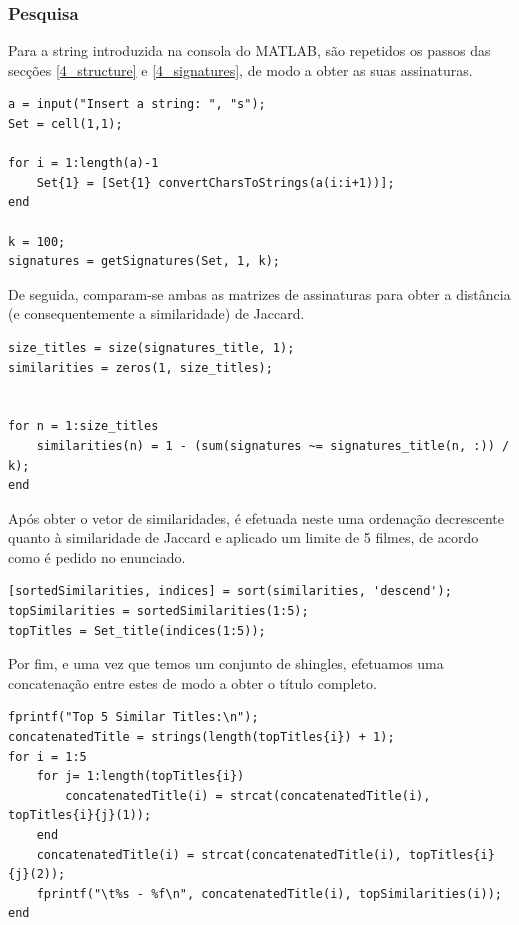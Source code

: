 \documentclass[portuguese, 11pt, a4paper,titlepage, oneside]{article}
\begin{document}
\subsubsection{Pesquisa}
Para a string introduzida na consola do MATLAB, são repetidos os passos das secções \ref{4_structure} e \ref{4_signatures}, de modo a obter as suas assinaturas.

\begin{lstlisting}[style=Matlab-editor]
a = input("Insert a string: ", "s");
Set = cell(1,1);

for i = 1:length(a)-1
    Set{1} = [Set{1} convertCharsToStrings(a(i:i+1))];
end

k = 100;
signatures = getSignatures(Set, 1, k);
\end{lstlisting}

De seguida, comparam-se ambas as matrizes de assinaturas para obter a distância (e consequentemente a similaridade) de Jaccard.

\begin{lstlisting}[style=Matlab-editor]
size_titles = size(signatures_title, 1);
similarities = zeros(1, size_titles);


for n = 1:size_titles
    similarities(n) = 1 - (sum(signatures ~= signatures_title(n, :)) / k);
end
\end{lstlisting}

Após obter o vetor de similaridades, é efetuada neste uma ordenação decrescente quanto à similaridade de Jaccard e aplicado um limite de 5 filmes, de acordo como é pedido no enunciado.
\begin{lstlisting}[style=Matlab-editor]
[sortedSimilarities, indices] = sort(similarities, 'descend');
topSimilarities = sortedSimilarities(1:5);
topTitles = Set_title(indices(1:5));
\end{lstlisting}

Por fim, e uma vez que temos um conjunto de shingles, efetuamos uma concatenação entre estes de modo a obter o título completo.

\begin{lstlisting}[style=Matlab-editor]
fprintf("Top 5 Similar Titles:\n");
concatenatedTitle = strings(length(topTitles{i}) + 1);
for i = 1:5
    for j= 1:length(topTitles{i})
        concatenatedTitle(i) = strcat(concatenatedTitle(i), topTitles{i}{j}(1));
    end
    concatenatedTitle(i) = strcat(concatenatedTitle(i), topTitles{i}{j}(2));
    fprintf("\t%s - %f\n", concatenatedTitle(i), topSimilarities(i));
end
\end{lstlisting}
\end{document}

